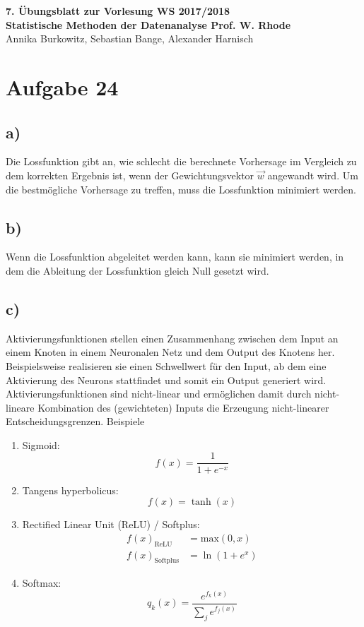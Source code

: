 \documentclass[a4paper, 11pt]{article}
\begin{document}
\noindent
\large{\textbf{7. Übungsblatt zur Vorlesung \hfill WS 2017/2018 \\
Statistische Methoden der Datenanalyse \hfill Prof. W. Rhode}} \\
Annika Burkowitz, Sebastian Bange, Alexander Harnisch \\
\noindent\makebox[\linewidth]{\rule{\textwidth}{0.4pt}}

\section*{Aufgabe 24}
\subsection*{a)}
Die Lossfunktion gibt an, wie schlecht die berechnete Vorhersage im Vergleich
zu dem korrekten Ergebnis ist, wenn der Gewichtungsvektor $\vec{w}$ angewandt wird.
Um die bestmögliche Vorhersage zu treffen, muss die Lossfunktion minimiert werden.

\subsection*{b)}
Wenn die Lossfunktion abgeleitet werden kann, kann sie minimiert werden, in dem
die Ableitung der Lossfunktion gleich Null gesetzt wird.

\subsection*{c)}
Aktivierungsfunktionen stellen einen Zusammenhang zwischen dem Input an einem
Knoten in einem Neuronalen Netz und dem Output des Knotens her. Beispielsweise
realisieren sie einen Schwellwert für den Input, ab dem eine Aktivierung des
Neurons stattfindet und somit ein Output generiert wird.
Aktivierungsfunktionen sind nicht-linear und ermöglichen damit durch nicht-lineare
Kombination des (gewichteten) Inputs die Erzeugung nicht-linearer Entscheidungsgrenzen.
\newline
Beispiele
\begin{enumerate}
  \item Sigmoid:
   \begin{equation*}
     f(x)=\frac{1}{1+e^{-x}}
   \end{equation*}
  \item Tangens hyperbolicus:
   \begin{equation*}
     f(x)=\tanh(x)
   \end{equation*}
  \item Rectified Linear Unit (ReLU) / Softplus:
   \begin{align*}
     f(x)_\text{ReLU}&=\text{max}(0,x)\\
     f(x)_\text{Softplus}&=\ln\left(1+e^{x}\right)
   \end{align*}
  \item Softmax:
   \begin{equation*}
     q_k(x)=\frac{e^{f_k(x)}}{\sum_j e^{f_j(x)}}
   \end{equation*}
\end{enumerate}
\end{document}
